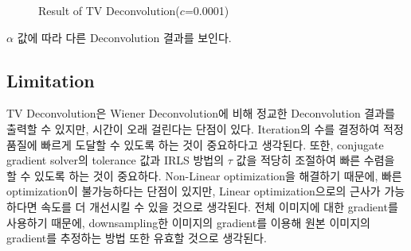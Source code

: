 \documentclass{report}
\begin{document}
\begin{figure}[htbp]
    \centering
    \hspace{1pt}
    \hspace{1pt}
    \hspace{1pt}
    \caption{Result of TV Deconvolution($c$=0.0001)}
\end{figure}

$\alpha$ 값에 따라 다른 Deconvolution 결과를 보인다.

\subsection*{Limitation}

TV Deconvolution은 Wiener Deconvolution에 비해 정교한 Deconvolution 결과를 출력할 수 있지만, 시간이 오래 걸린다는 단점이 있다.
Iteration의 수를 결정하여 적정 품질에 빠르게 도달할 수 있도록 하는 것이 중요하다고 생각된다.
또한, conjugate gradient solver의 tolerance 값과 IRLS 방법의 $\tau$ 값을 적당히 조절하여 빠른 수렴을 할 수 있도록 하는 것이 중요하다.
Non-Linear optimization을 해결하기 때문에, 빠른 optimization이 불가능하다는 단점이 있지만, Linear optimization으로의 근사가 가능하다면
속도를 더 개선시킬 수 있을 것으로 생각된다.
전체 이미지에 대한 gradient를 사용하기 때문에, downsampling한 이미지의 gradient를 이용해 원본 이미지의 gradient를 추정하는 방법 또한 유효할 것으로 생각된다.
\end{document}
